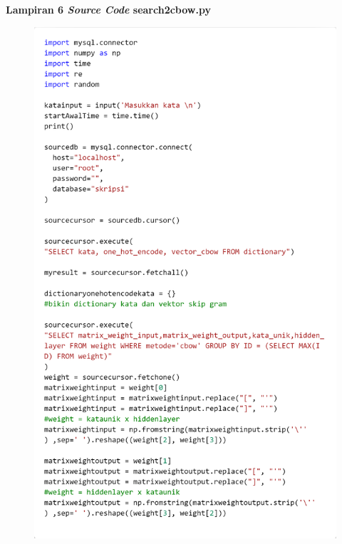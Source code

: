 \documentclass[12pt]{report}
\begin{document}
\newpage
{\parindent0pt \textbf{Lampiran 6 \textit{Source Code} search2cbow.py}}
\begin{figure}[H]
\centering
\includegraphics[scale=0.3]{search2cbow1}
\end{figure}
\end{document}
